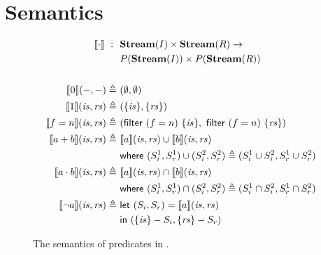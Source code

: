 \documentclass[sigconf,usenames,dvipsnames,svgnames,table]{acmart}
\begin{document}
\section {Semantics}
        \begin{figure}
          \centering
          \begin{align*}
            \interp{ \cdot }\ 
              :\ \ &
              \mathbf{Stream}(I)\times \mathbf{Stream}(R) \rightarrow \\
              & P(\mathbf{Stream}(I))\times P(\mathbf{Stream}(R)) 
              \\
              \\
            \interp{ 0 }(-, -)
              \defeq\ &
              (\emptyset , \emptyset)
              \\ %
            \interp{ 1 }(\mathit{is}, \mathit{rs})
              \defeq\ &
              (\{\mathit{is}\},\{\mathit{rs}\})
              \\
            \interp{ f=n }(\mathit{is}, \mathit{rs})
              \defeq\ &
              (\mathsf{filter}\ (f=n)\ \{\mathit{is}\},\
               \mathsf{filter}\ (f=n)\ \{\mathit{rs}\}) 
              \\
            \interp{ a + b }(\mathit{is}, \mathit{rs})
              \defeq\ &
              \interp { a }(\mathit{is}, \mathit{rs})\cup
              \interp { b }(\mathit{is}, \mathit{rs}) \\
              &\mathsf{where}\ (S_i^1, S_r^1)\cup (S_i^2, S_r^2)\defeq
                (S_i^1\cup S_i^2, S_r^1\cup S_r^2)\\
            \interp { a \cdot b }(\mathit{is}, \mathit{rs})
              \defeq\ &
              \interp { a }(\mathit{is}, \mathit{rs})\cap
              \interp { b }(\mathit{is}, \mathit{rs}) \\
              &\mathsf{where}\ (S_i^1, S_r^1)\cap (S_i^2, S_r^2)\defeq
                (S_i^1\cap S_i^2, S_r^1\cap S_r^2)\\
            \interp { \neg a }(\mathit{is}, \mathit{rs})
              \defeq\ &
              \mathsf{let}\ (S_i, S_r) = \interp {a}(\mathit{is}, \mathit{rs}) \\
              &\mathsf{in}\ (\{\mathit{is}\} - S_i, \{\mathit{rs}\} - S_r)
          \end{align*}
          \caption{The semantics of predicates in \oldname.}
          \label{fig:garuda:sem:pred}
        \end{figure}
\end{document}
